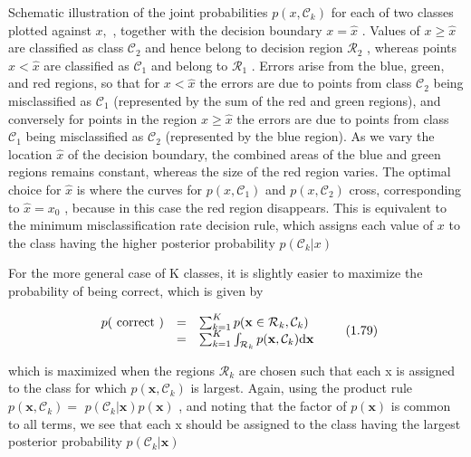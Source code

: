 \documentclass[
  10
]{article}
\begin{document}
Schematic illustration of the joint probabilities
\(p ( x , \mathcal { C } _ { k } )\) for each of two classes plotted
against \(x ,\) , together with the decision boundary
\(x = { \widehat { x } }\) . Values of
\(x \geqslant { \widehat { x } }\) are classified as class
\(\mathcal { C } _ { 2 }\) and hence belong to decision region
\(\mathcal { R } _ { 2 }\) , whereas points \(x < { \widehat { x } }\)
are classified as \(\mathcal { C } _ { 1 }\) and belong to
\(\mathcal { R } _ { 1 }\) . Errors arise from the blue, green, and red
regions, so that for \(x < { \widehat { x } }\) the errors are due to
points from class \(\mathcal { C } _ { 2 }\) being misclassified as
\(\mathcal { C } _ { 1 }\) (represented by the sum of the red and green
regions), and conversely for points in the region
\(x \geqslant { \widehat { x } }\) the errors are due to points from
class \(\mathcal { C } _ { 1 }\) being misclassified as
\(\mathcal { C } _ { 2 }\) (represented by the blue region). As we vary
the location \(\widehat { x }\) of the decision boundary, the combined
areas of the blue and green regions remains constant, whereas the size
of the red region varies. The optimal choice for \(\widehat { x }\) is
where the curves for \(p ( x , \mathcal { C } _ { 1 } )\) and
\(p ( x , \mathcal { C } _ { 2 } )\) cross, corresponding to
\(\widehat { x } = x _ { 0 }\) , because in this case the red region
disappears. This is equivalent to the minimum misclassification rate
decision rule, which assigns each value of \(x\) to the class having the
higher posterior probability \(p ( \mathcal { C } _ { k } | x )\)

For the more general case of K classes, it is slightly easier to
maximize the probability of being correct, which is given by

\[
\begin{array}{r c l} p (\text { correct }) & = & \sum_ {k = 1} ^ {K} p (\mathbf {x} \in \mathcal {R} _ {k}, \mathcal {C} _ {k}) \\ & = & \sum_ {k = 1} ^ {K} \int_ {\mathcal {R} _ {k}} p (\mathbf {x}, \mathcal {C} _ {k})   \mathrm{d} \mathbf {x} \end{array}\tag{1.79}
\]

which is maximized when the regions \(\mathcal { R } _ { k }\) are
chosen such that each x is assigned to the class for which
\(p ( \mathbf { x } , \mathcal { C } _ { k } )\) is largest. Again,
using the product rule
\(p ( \mathbf { x } , \mathcal { C } _ { k } ) =\)
\(p ( \mathcal { C } _ { k } | \mathbf { x } ) p ( \mathbf { x } )\) ,
and noting that the factor of \(p ( \mathbf { x } )\) is common to all
terms, we see that each x should be assigned to the class having the
largest posterior probability
\(p ( \mathcal { C } _ { k } \vert \mathbf { x } )\)
\end{document}
